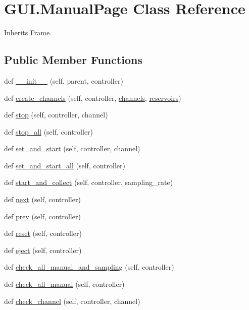 \hypertarget{class_g_u_i_1_1_manual_page}{}\section{G\+U\+I.\+Manual\+Page Class Reference}
\label{class_g_u_i_1_1_manual_page}


Inherits Frame.

\subsection*{Public Member Functions}
\begin{DoxyCompactItemize}
\item 
def \mbox{\hyperlink{class_g_u_i_1_1_manual_page_a2734204da1ed4dacc54d8b6d2b8a71e3}{\+\_\+\+\_\+init\+\_\+\+\_\+}} (self, parent, controller)
\item 
def \mbox{\hyperlink{class_g_u_i_1_1_manual_page_adaf2d13de11696b3803b541dfcc47f61}{create\+\_\+channels}} (self, controller, \mbox{\hyperlink{class_g_u_i_1_1_manual_page_a81b94d5721f909a8c14888907d2ce4fe}{channels}}, \mbox{\hyperlink{class_g_u_i_1_1_manual_page_a8555c34c8bdcc975ff052c36cc309921}{reservoirs}})
\item 
def \mbox{\hyperlink{class_g_u_i_1_1_manual_page_a14d88e9b478d9bb8828c0639dd258d1e}{stop}} (self, controller, channel)
\item 
def \mbox{\hyperlink{class_g_u_i_1_1_manual_page_a6e9cb2efbec0918bb12f6bc9f26fbfde}{stop\+\_\+all}} (self, controller)
\item 
def \mbox{\hyperlink{class_g_u_i_1_1_manual_page_af00991d5107b8b590f222c7c5a82c8d9}{set\+\_\+and\+\_\+start}} (self, controller, channel)
\item 
def \mbox{\hyperlink{class_g_u_i_1_1_manual_page_a9c7c4c6f8b8811f2c88841419faa2cc2}{set\+\_\+and\+\_\+start\+\_\+all}} (self, controller)
\item 
def \mbox{\hyperlink{class_g_u_i_1_1_manual_page_afa50301e19523a6a4151c2c2c6d9a969}{start\+\_\+and\+\_\+collect}} (self, controller, sampling\+\_\+rate)
\item 
def \mbox{\hyperlink{class_g_u_i_1_1_manual_page_a3edbdcd63e5dcb8fc7e1c9b21110206e}{next}} (self, controller)
\item 
def \mbox{\hyperlink{class_g_u_i_1_1_manual_page_a03fe8089188d5fd8ccc6f8a26a516383}{prev}} (self, controller)
\item 
def \mbox{\hyperlink{class_g_u_i_1_1_manual_page_a1b062258c6e05d3477ebcf94d5deff3b}{reset}} (self, controller)
\item 
def \mbox{\hyperlink{class_g_u_i_1_1_manual_page_a9c014c2c40c5a160ecb3e0329fa289ea}{eject}} (self, controller)
\item 
def \mbox{\hyperlink{class_g_u_i_1_1_manual_page_a4c34ad73eebd301c4981a02cf4e56daa}{check\+\_\+all\+\_\+manual\+\_\+and\+\_\+sampling}} (self, controller)
\item 
def \mbox{\hyperlink{class_g_u_i_1_1_manual_page_aa7967ed411dd9846fd92f65b494972cf}{check\+\_\+all\+\_\+manual}} (self, controller)
\item 
def \mbox{\hyperlink{class_g_u_i_1_1_manual_page_a68aaed68e1efc88cfcf68a0830036166}{check\+\_\+channel}} (self, controller, channel)
\end{DoxyCompactItemize}
